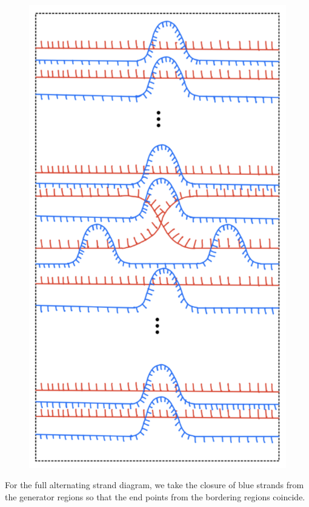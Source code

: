 \begin{figure}[H] 
    \centering
    \includegraphics[scale = 0.55]{diagrams/natural_alternating_diagrams/9.png}
    \caption{}
    \label{fig:your-label}
\end{figure}

For the full alternating strand diagram, we take the closure of blue strands from the generator regions so that the end points from the bordering regions coincide.

